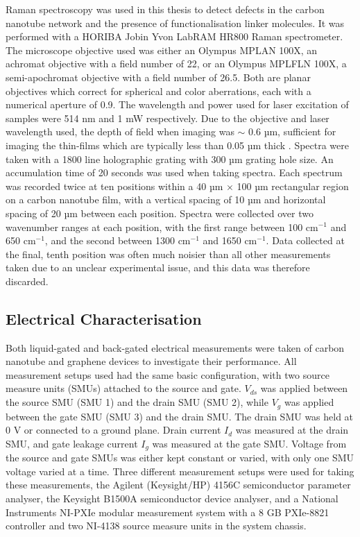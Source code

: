 \documentclass[
  a4paper,
]{scrbook}
\begin{document}
Raman spectroscopy was used in this thesis to detect defects in the
carbon nanotube network and the presence of functionalisation linker
molecules. It was performed with a HORIBA Jobin Yvon LabRAM HR800 Raman
spectrometer. The microscope objective used was either an Olympus MPLAN
100X, an achromat objective with a field number of 22, or an Olympus
MPLFLN 100X, a semi-apochromat objective with a field number of 26.5.
Both are planar objectives which correct for spherical and color
aberrations, each with a numerical aperture of 0.9. The wavelength and
power used for laser excitation of samples were 514 nm and 1 mW
respectively. Due to the objective and laser wavelength used, the depth
of field when imaging was \(\sim\) 0.6 µm, sufficient for imaging the
thin-films which are typically less than 0.05 µm thick \autocite{DOF}.
Spectra were taken with a 1800 line holographic grating with 300 µm
grating hole size. An accumulation time of 20 seconds was used when
taking spectra. Each spectrum was recorded twice at ten positions within
a 40 µm \(\times\) 100 µm rectangular region on a carbon nanotube film,
with a vertical spacing of 10 µm and horizontal spacing of 20 µm between
each position. Spectra were collected over two wavenumber ranges at each
position, with the first range between 100 cm\(^{-1}\) and 650
cm\(^{-1}\), and the second between 1300 cm\(^{-1}\) and 1650
cm\(^{-1}\). Data collected at the final, tenth position was often much
noisier than all other measurements taken due to an unclear experimental
issue, and this data was therefore discarded.

\hypertarget{sec-electrical-characterisation}{%
\subsection{Electrical
Characterisation}\label{sec-electrical-characterisation}}

Both liquid-gated and back-gated electrical measurements were taken of
carbon nanotube and graphene devices to investigate their performance.
All measurement setups used had the same basic configuration, with two
source measure units (SMUs) attached to the source and gate. \(V_{ds}\)
was applied between the source SMU (SMU 1) and the drain SMU (SMU 2),
while \(V_{g}\) was applied between the gate SMU (SMU 3) and the drain
SMU. The drain SMU was held at 0 V or connected to a ground plane. Drain
current \(I_{d}\) was measured at the drain SMU, and gate leakage
current \(I_{g}\) was measured at the gate SMU. Voltage from the source
and gate SMUs was either kept constant or varied, with only one SMU
voltage varied at a time. Three different measurement setups were used
for taking these measurements, the Agilent (Keysight/HP) 4156C
semiconductor parameter analyser, the Keysight B1500A semiconductor
device analyser, and a National Instruments NI-PXIe modular measurement
system with a 8 GB PXIe-8821 controller and two NI-4138 source measure
units in the system chassis.
\end{document}
